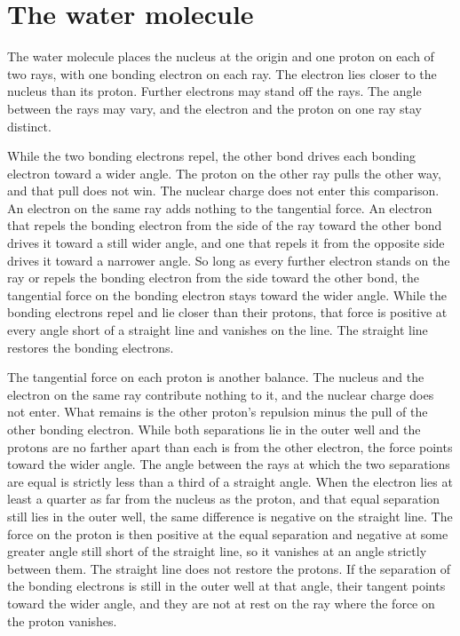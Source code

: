 \documentclass[a4paper]{article}
\begin{document}
\section{The water molecule}
\label{sec:water}

The water molecule places the nucleus at the origin and one proton on each of two rays, with one bonding electron on each ray. The electron lies closer to the nucleus than its proton. Further electrons may stand off the rays. The angle between the rays may vary, and the electron and the proton on one ray stay distinct.

While the two bonding electrons repel, the other bond drives each bonding electron toward a wider angle. The proton on the other ray pulls the other way, and that pull does not win. The nuclear charge does not enter this comparison. An electron on the same ray adds nothing to the tangential force. An electron that repels the bonding electron from the side of the ray toward the other bond drives it toward a still wider angle, and one that repels it from the opposite side drives it toward a narrower angle. So long as every further electron stands on the ray or repels the bonding electron from the side toward the other bond, the tangential force on the bonding electron stays toward the wider angle. While the bonding electrons repel and lie closer than their protons, that force is positive at every angle short of a straight line and vanishes on the line. The straight line restores the bonding electrons.

The tangential force on each proton is another balance. The nucleus and the electron on the same ray contribute nothing to it, and the nuclear charge does not enter. What remains is the other proton's repulsion minus the pull of the other bonding electron. While both separations lie in the outer well and the protons are no farther apart than each is from the other electron, the force points toward the wider angle. The angle between the rays at which the two separations are equal is strictly less than a third of a straight angle. When the electron lies at least a quarter as far from the nucleus as the proton, and that equal separation still lies in the outer well, the same difference is negative on the straight line. The force on the proton is then positive at the equal separation and negative at some greater angle still short of the straight line, so it vanishes at an angle strictly between them. The straight line does not restore the protons. If the separation of the bonding electrons is still in the outer well at that angle, their tangent points toward the wider angle, and they are not at rest on the ray where the force on the proton vanishes.
\end{document}
